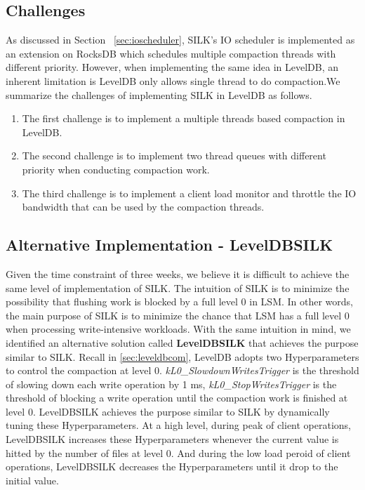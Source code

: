 \documentclass[letter,twocolumn,10pt]{article}
\begin{document}
\subsection {Challenges}
As discussed in Section ~\ref{sec:ioscheduler}, SILK's IO scheduler is implemented as an extension on RocksDB which schedules multiple compaction threads with different priority. However, when implementing the same idea in LevelDB, an inherent limitation is LevelDB only allows single thread to do compaction.We summarize the challenges of implementing SILK in LevelDB as follows.   
\begin{enumerate}
\item The first challenge is to implement a multiple threads based compaction in LevelDB.
\item The second challenge is to implement two thread queues with different priority when conducting compaction work.
\item The third challenge is to implement a client load monitor and throttle the IO bandwidth that can be used by the compaction threads.
\end{enumerate}

\subsection {Alternative Implementation - LevelDBSILK}
Given the time constraint of three weeks, we believe it is difficult to achieve the same level of implementation of SILK. The intuition of SILK is to minimize the possibility that flushing work is blocked by a full level $0$ in LSM. In other words, the main purpose of SILK is to minimize the chance that LSM has a full level $0$ when processing write-intensive workloads. With the same intuition in mind, we identified an alternative solution called \textbf{LevelDBSILK} that achieves the purpose similar to SILK. Recall in \ref{sec:leveldbcom}, LevelDB adopts two Hyperparameters to control the compaction at level $0$. \textit{kL0\_SlowdownWritesTrigger} is the threshold of slowing down each write operation by 1 ms, \textit{kL0\_StopWritesTrigger} is the threshold of blocking a write operation until the compaction work is finished at level $0$. LevelDBSILK achieves the purpose similar to SILK by dynamically tuning these Hyperparameters. At a high level, during peak of client operations, LevelDBSILK increases these Hyperparameters whenever the current value is hitted by the number of files at level $0$. And during the low load peroid of client operations, LevelDBSILK decreases the Hyperparameters until it drop to the initial value.
\end{document}
